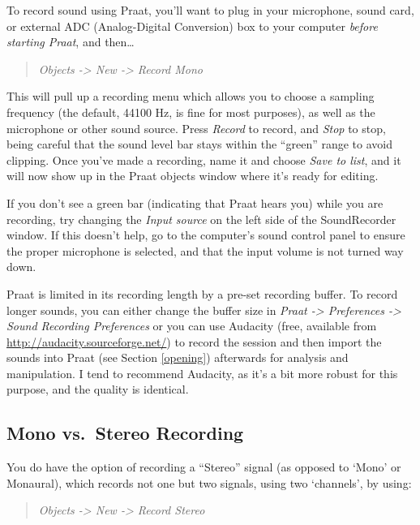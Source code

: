 To record sound using Praat, you'll want to plug in your microphone,
sound card, or external ADC (Analog-Digital Conversion) box to your
computer \emph{before starting Praat}, and then\ldots{}

\begin{quote}
\emph{Objects -\textgreater{} New -\textgreater{} Record Mono}
\end{quote}

This will pull up a recording menu which allows you to choose a sampling
frequency (the default, 44100 Hz, is fine for most purposes), as well as
the microphone or other sound source. Press \emph{Record} to record, and
\emph{Stop} to stop, being careful that the sound level bar stays within
the ``green'' range to avoid clipping. Once you've made a recording,
name it and choose \emph{Save to list}, and it will now show up in the
Praat objects window where it's ready for editing.

If you don't see a green bar (indicating that Praat hears you) while you
are recording, try changing the \emph{Input source} on the left side of
the SoundRecorder window. If this doesn't help, go to the computer's
sound control panel to ensure the proper microphone is selected, and
that the input volume is not turned way down.

Praat is limited in its recording length by a pre-set recording buffer.
To record longer sounds, you can either change the buffer size in
\emph{Praat -\textgreater{} Preferences -\textgreater{} Sound Recording
Preferences} or you can use Audacity (free, available from
\url{http://audacity.sourceforge.net/}) to record the session and then
import the sounds into Praat (see Section \ref{opening}) afterwards for
analysis and manipulation. I tend to recommend Audacity, as it's a bit
more robust for this purpose, and the quality is identical.

\hypertarget{mono-vs.-stereo-recording}{%
\subsection{Mono vs.~Stereo Recording}\label{mono-vs.-stereo-recording}}

\label{sec:stereo}

You do have the option of recording a ``Stereo'' signal (as opposed to
`Mono' or Monaural), which records not one but two signals, using two
`channels', by using:

\begin{quote}
\emph{Objects -\textgreater{} New -\textgreater{} Record Stereo}
\end{quote}

